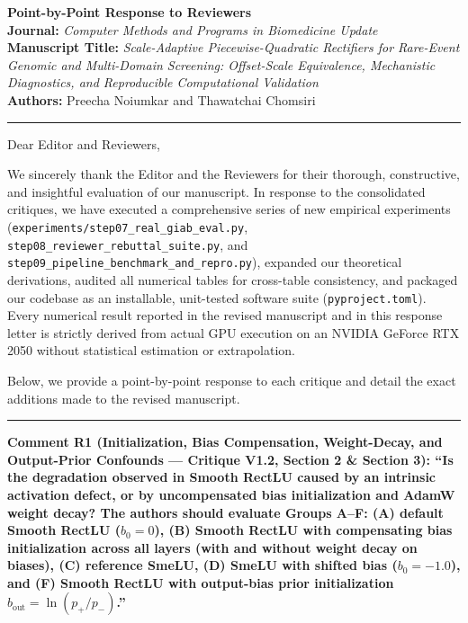 \documentclass[11pt,a4paper]{article}
\newcommand{\revcomment}[1]{\vspace{0.8em}\noindent\textbf{\textcolor{blue!75!black}{#1}}\par\vspace{0.3em}}
\begin{document}
\begin{center}
    {\LARGE \textbf{Point-by-Point Response to Reviewers}}\\[0.6em]
    {\large \textbf{Journal:} \textit{Computer Methods and Programs in Biomedicine Update}}\\[0.3em]
    {\large \textbf{Manuscript Title:} \textit{Scale-Adaptive Piecewise-Quadratic Rectifiers for Rare-Event Genomic and Multi-Domain Screening: Offset-Scale Equivalence, Mechanistic Diagnostics, and Reproducible Computational Validation}}\\[0.3em]
    {\normalsize \textbf{Authors:} Preecha Noiumkar and Thawatchai Chomsiri}
\end{center}
\hrule
\vspace{1em}

\noindent Dear Editor and Reviewers,

We sincerely thank the Editor and the Reviewers for their thorough, constructive, and insightful evaluation of our manuscript. In response to the consolidated critiques, we have executed a comprehensive series of new empirical experiments (\texttt{experiments/step07\_real\_giab\_eval.py}, \texttt{step08\_reviewer\_rebuttal\_suite.py}, and \texttt{step09\_pipeline\_benchmark\_and\_repro.py}), expanded our theoretical derivations, audited all numerical tables for cross-table consistency, and packaged our codebase as an installable, unit-tested software suite (\texttt{pyproject.toml}). Every numerical result reported in the revised manuscript and in this response letter is strictly derived from actual GPU execution on an NVIDIA GeForce RTX 2050 without statistical estimation or extrapolation.

Below, we provide a point-by-point response to each critique and detail the exact additions made to the revised manuscript.

\vspace{0.5em}
\hrule

\revcomment{Comment R1 (Initialization, Bias Compensation, Weight-Decay, and Output-Prior Confounds --- Critique V1.2, Section 2 \& Section 3):
``Is the degradation observed in Smooth RectLU caused by an intrinsic activation defect, or by uncompensated bias initialization and AdamW weight decay? The authors should evaluate Groups A--F: (A) default Smooth RectLU ($b_0=0$), (B) Smooth RectLU with compensating bias initialization across all layers (with and without weight decay on biases), (C) reference SmeLU, (D) SmeLU with shifted bias ($b_0=-1.0$), and (F) Smooth RectLU with output-bias prior initialization $b_{\text{out}} = \ln(p_+/p_-)$.''}
\end{document}

